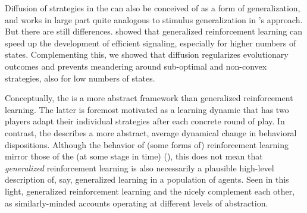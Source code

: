 Diffusion of strategies in the \rdd can also be conceived of as a form
of generalization, and works in large part quite analogous to stimulus
generalization in \citeauthor{OConnor2013:The-Evolution-o}'s
approach. But there are still
differences. \citeauthor{OConnor2013:The-Evolution-o} showed that
generalized reinforcement learning can speed up the development of
efficient signaling, especially for higher numbers of
states. Complementing this, we showed that diffusion regularizes
evolutionary outcomes and prevents meandering around sub-optimal and
non-convex strategies, also for low numbers of states.

Conceptually, the \rdd is a more abstract framework than generalized
reinforcement learning. The latter is foremost motivated as a learning
dynamic that has two players adapt their individual strategies after
each concrete round of play. In contrast, the \rdd describes a more
abstract, average dynamical change in behavioral
dispositions. Although the behavior of (some forms of) reinforcement
learning mirror those of the \rd (at some stage in time)
(\cite{BorgersSarin997:Learning-Throug,HopkinsPosch2005:Attainability-o,Beggs2005:On-the-Converge}),
this does not mean that \emph{generalized} reinforcement learning is
also necessarily a plausible high-level description of, say,
generalized learning in a population of agents. Seen in this light,
generalized reinforcement learning and the \rdd nicely complement each
other, as similarly-minded accounts operating at different levels of
abstraction.

